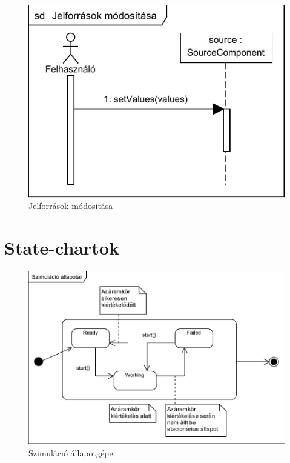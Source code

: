 \begin{figure}[H]
\begin{center}
\includegraphics{chapters/chapter04/seqdiagrams/jelforrasok_modositasa.pdf}
\caption{Jelforrások módosítása}
\label{fig:jelforrasok_modositasa}
\end{center}
\end{figure}

\section{State-chartok}

\begin{figure}[H]
\begin{center}
\includegraphics{chapters/chapter04/seqdiagrams/allapotgep.pdf}
\caption{Szimuláció állapotgépe}
\label{fig:allapotgep}
\end{center}
\end{figure}


